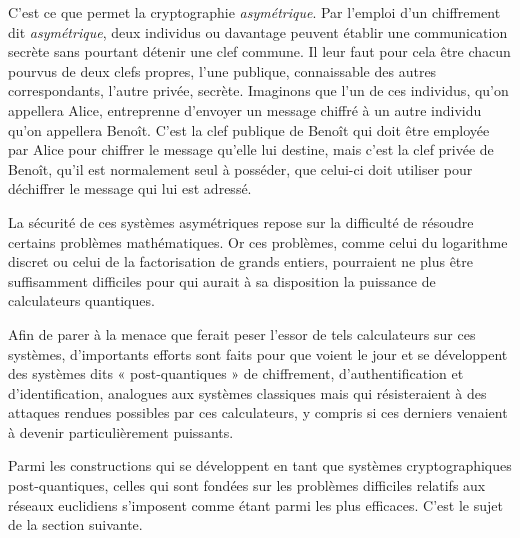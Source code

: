 C’est ce que permet la cryptographie \emph{asymétrique}.
Par l’emploi d’un chiffrement dit \emph{asymétrique}, deux individus ou davantage peuvent établir
une communication secrète sans pourtant détenir une clef commune.
Il leur faut pour cela être chacun pourvus de deux clefs propres, l’une publique, connaissable des
autres correspondants, l’autre privée, secrète. 
Imaginons que l’un de ces individus, qu’on appellera Alice, entreprenne d’envoyer un message chiffré
à un autre individu qu’on appellera Benoît. C’est la clef publique de Benoît qui doit être employée par Alice
pour chiffrer le message qu’elle lui destine, mais c’est la clef privée de Benoît, qu’il est
normalement seul à posséder, que celui-ci doit utiliser pour déchiffrer le message qui lui est
adressé.

La sécurité de ces systèmes asymétriques repose sur la difficulté de résoudre certains problèmes
mathématiques.
Or ces problèmes, comme celui du logarithme discret ou celui de la factorisation de
grands entiers, pourraient ne plus être suffisamment difficiles pour qui aurait à sa disposition la
puissance de calculateurs quantiques.

Afin de parer à la menace que ferait peser l’essor de tels calculateurs sur ces systèmes,
d’importants efforts sont faits pour que voient le jour et se développent des systèmes dits «
post-quantiques » de chiffrement, d’authentification et d’identification, analogues aux systèmes
classiques mais qui résisteraient à des attaques rendues possibles par ces calculateurs, y compris
si ces derniers venaient à devenir particulièrement puissants.

Parmi les constructions qui se développent en tant que systèmes cryptographiques post-quantiques, celles qui sont fondées sur les problèmes difficiles relatifs aux réseaux euclidiens s’imposent comme étant parmi les plus efficaces. C’est le sujet de la section suivante.




